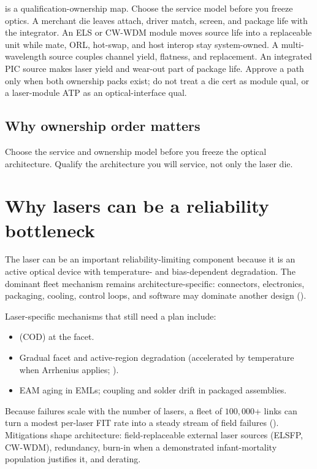  is a qualification-ownership map. Choose the service
model before you freeze optics. A merchant die leaves attach, driver match,
screen, and package life with the integrator. An ELS or CW-WDM module moves
source life into a replaceable unit while mate, ORL, hot-swap, and host interop
stay system-owned. A multi-wavelength source couples channel yield, flatness,
and replacement. An integrated PIC source makes laser yield and wear-out part of
package life. Approve a path only when both ownership packs exist; do not treat
a die cert as module qual, or a laser-module ATP as an optical-interface qual.

\subsection{Why ownership order matters}

Choose the service and ownership model before you freeze the optical
architecture. Qualify the architecture you will service, not only the laser
die.

\section{Why lasers can be a reliability bottleneck}

The laser can be an important reliability-limiting component because it is an
active optical device with temperature- and bias-dependent degradation. The
dominant fleet mechanism remains architecture-specific: connectors, electronics,
packaging, cooling, control loops, and software may dominate another design
().

Laser-specific mechanisms that still need a plan include:

\begin{itemize}
\item {} (COD) at the facet.
\item Gradual facet and active-region degradation (accelerated by temperature
      when Arrhenius applies; ).
\item EAM aging in EMLs; coupling and solder drift in packaged assemblies.
\end{itemize}

Because failures scale with the number of lasers, a fleet of $100{,}000$+ links
can turn a modest per-laser FIT rate into a steady stream of field failures
(). Mitigations shape architecture:
field-replaceable external laser sources (ELSFP, CW-WDM), redundancy, burn-in
when a demonstrated infant-mortality population justifies it, and derating.

